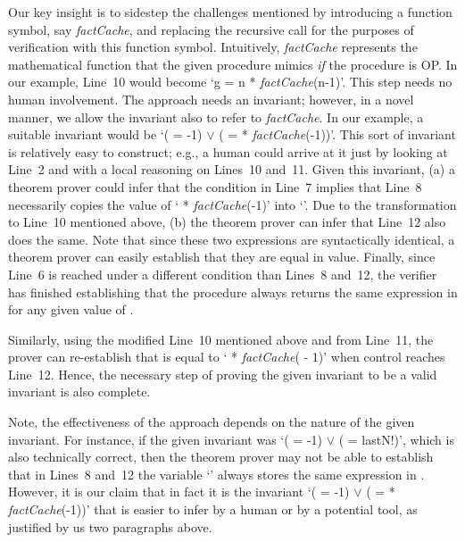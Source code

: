 Our key insight is to sidestep the challenges mentioned by introducing a
function symbol, say \emph{factCache}, and replacing the recursive call for the purposes
of verification with this function symbol. Intuitively, \emph{factCache} represents the
mathematical function that the given procedure mimics \emph{if} the procedure is
OP.  In our example, Line~10 would become `g = n * \emph{factCache}(n-1)'. This step
needs no human involvement. The approach needs an invariant; however, in a
novel manner, we allow the invariant also to refer to \emph{factCache}. In our example,
a suitable invariant would be `( = -1) $\vee$ ( =  *
\emph{factCache}(-1))'. This sort of invariant is relatively easy to construct;
e.g., a human could arrive at it just by looking at Line~2 and with a local
reasoning on Lines~10 and~11. Given this invariant, (a) a theorem prover
could infer that the condition in Line~7 implies that Line~8 necessarily
copies the value of ` * \emph{factCache}(-1)' into `'. Due to the transformation to Line~10 mentioned above,
(b) the theorem prover can infer that Line~12 also does the same. Note that since these two expressions are syntactically
identical, a theorem prover can easily establish that they are equal in
value.  Finally, since Line~6 is reached under a different condition than
Lines~8 and~12, the verifier has finished establishing that the procedure
always returns the same expression in  for any given value of .

Similarly, using the modified Line~10 mentioned above and from Line~11, the
prover can re-establish that  is equal to ` * \emph{factCache}( - 1)' when
control reaches Line~12. Hence, the necessary step of proving the given
invariant to be a valid invariant is also complete. 

Note, the effectiveness of the approach depends on the nature of the given
invariant. For instance, if the given invariant was `( = -1) $\vee$ ( =
lastN!)', which is also technically correct, then the theorem prover may
not be able to establish that in Lines~8 and~12 the variable `' always
stores the same expression in . However, it is our claim that in fact it is the
invariant `( = -1) $\vee$ ( =  * \emph{factCache}(-1))' that is
easier to infer by a human or by a potential tool, as justified by us two
paragraphs above.


